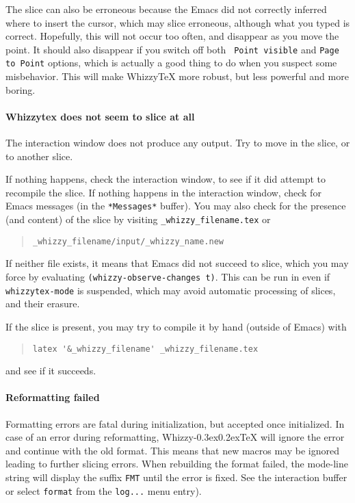 \documentclass[12pt]{article}
\makeatletter
\let \lst \verb
\def \whizzy {{Whizzy\kern -0.3ex\raise 0.2ex\hbox{\let \@\relax\TeX}}}
\makeatother
\begin{document}
The slice can also be erroneous because the Emacs did not correctly inferred
where to insert the cursor, which may slice erroneous, although what you
typed is correct. Hopefully, this will not occur too often, and disappear as
you move the point. It should also disappear if you switch off both {\tt
Point visible} and {\tt Page to Point} options, which is actually a good
thing to do when you suspect some misbehavior.  This will make WhizzyTeX
more robust, but less powerful and more boring.

\paragraph {Whizzytex does not seem to slice at all}

The interaction window does not produce any output. 
Try to move in the slice, or to another slice. 

If nothing happens, check the interaction
window, to see if it did attempt to recompile the slice.
If nothing happens in the interaction window, check for Emacs messages
(in the \lst"*Messages*" buffer). You may also check for the presence 
(and content) of the slice by visiting 
\lst"_whizzy_filename.tex" or
\begin{quote}
\begin{verbatim}
_whizzy_filename/input/_whizzy_name.new
\end{verbatim}
\end{quote}
If neither file exists, it means that Emacs did
not succeed to slice, which you may force by evaluating
\lst"(whizzy-observe-changes t)". 
This can be run in even if {\tt whizzytex-mode} is suspended, which may
avoid automatic processing of slices, and their erasure.

If the slice is present, you may try to compile it by hand (outside of
Emacs) with 
\begin{quote}
\begin{verbatim}
latex '&_whizzy_filename' _whizzy_filename.tex
\end{verbatim}
\end{quote}
and see if it succeeds. 


\paragraph {Reformatting failed}

Formatting errors are fatal during initialization, but accepted once
initialized. In case of an error during reformatting, {\whizzy} will ignore
the error and continue with the old format.  This means that new macros may
be ignored leading to further slicing errors. When rebuilding the format
failed, the mode-line string will display the suffix \lst"FMT" until the
error is fixed.  See the interaction buffer or select \lst"format" from the
\lst"log..." menu entry).
\end{document}
